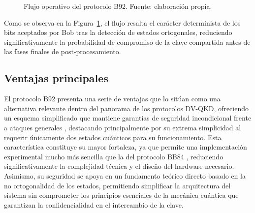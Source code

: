 \begin{figure}[h!]
\centering
{}
\caption{Flujo operativo del protocolo B92. Fuente: elaboración propia.}
\label{fig:flujo_b92_horizontal}
\end{figure}

Como se observa en la Figura~\ref{fig:flujo_b92_horizontal}, el flujo resalta el carácter determinista de los bits aceptados por Bob tras la detección de estados ortogonales, reduciendo significativamente la probabilidad de compromiso de la clave compartida antes de las fases finales de post-procesamiento.

\subsection{Ventajas principales}

El protocolo B92 \citep{bennett1992} presenta una serie de ventajas que lo sitúan como una alternativa relevante dentro del panorama de los protocolos DV-QKD, ofreciendo un esquema simplificado que mantiene garantías de seguridad incondicional frente a ataques generales \citep{tamaki2003}, destacando principalmente por su extrema simplicidad al requerir únicamente dos estados cuánticos para su funcionamiento. Esta característica constituye su mayor fortaleza, ya que permite una implementación experimental mucho más sencilla que la del protocolo BB84 \citep{bennett1984}, reduciendo significativamente la complejidad técnica y el diseño del hardware necesario. Asimismo, su seguridad se apoya en un fundamento teórico directo basado en la no ortogonalidad de los estados, permitiendo simplificar la arquitectura del sistema sin comprometer los principios esenciales de la mecánica cuántica que garantizan la confidencialidad en el intercambio de la clave.

